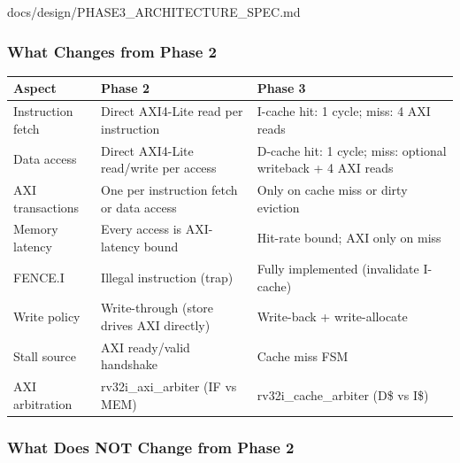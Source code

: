 \begin{relocated}{docs/design/PHASE3_ARCHITECTURE_SPEC.md}
\subsubsection{What Changes from Phase 2}\label{ds:ch:phase3-architecture:11-what-changes-from-phase-2}

{\small\setlength{\tabcolsep}{4pt}

{
\begin{longtable}[]{@{}
  >{\raggedright\arraybackslash}p{}
  >{\raggedright\arraybackslash}p{}
  >{\raggedright\arraybackslash}p{}@{}}
\toprule\noalign{}
\begin{minipage}[b]{\linewidth}\raggedright
Aspect
\end{minipage} & \begin{minipage}[b]{\linewidth}\raggedright
Phase 2
\end{minipage} & \begin{minipage}[b]{\linewidth}\raggedright
Phase 3
\end{minipage} \\
\midrule\noalign{}
\endhead
\bottomrule\noalign{}
\endlastfoot
Instruction fetch & Direct AXI4-Lite read per instruction & I-cache hit:
1 cycle; miss: 4 AXI reads \\
Data access & Direct AXI4-Lite read/\allowbreak{}write per access &
D-cache hit: 1 cycle; miss: optional writeback + 4 AXI reads \\
AXI transactions & One per instruction fetch or data access & Only on
cache miss or dirty eviction \\
Memory latency & Every access is AXI-latency bound & Hit-rate bound; AXI
only on miss \\
FENCE.I & Illegal instruction (trap) & Fully implemented (invalidate
I-cache) \\
Write policy & Write-through (store drives AXI directly) & Write-back +
write-allocate \\
Stall source & AXI ready/\allowbreak{}valid handshake & Cache miss
FSM \\
AXI arbitration & rv32i\_\allowbreak{}axi\_\allowbreak{}arbiter (IF vs
MEM) & rv32i\_\allowbreak{}cache\_\allowbreak{}arbiter (D\$ vs I\$) \\
\end{longtable}
}

}

\subsubsection{What Does NOT Change from Phase 2}\label{ds:ch:phase3-architecture:12-what-does-not-change-from-phase-2}


\end{relocated}
